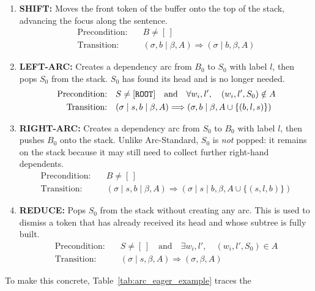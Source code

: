 \documentclass[12pt,letterpaper]{article}
\begin{document}
\begin{enumerate}
    \item \textbf{SHIFT:} Moves the front token of the buffer onto the top of the stack, advancing the focus along the sentence.
    \begin{align}
        \text{Precondition:} \quad & B \neq [\,] \\
        \text{Transition:} \quad & (\sigma, b \mid \beta, A) \Longrightarrow (\sigma \mid b, \beta, A)
    \end{align}
    
    \item \textbf{LEFT-ARC:} Creates a dependency arc from $B_0$ to $S_0$ with label $l$, then pops $S_0$ from the stack. $S_0$ has found its head and is no longer needed.
    \begin{align}
        \text{Precondition:} \quad & S \neq [\text{\texttt{ROOT}}] \quad \text{and} \quad \forall w_i, l', \quad (w_i, l', S_0) \notin A \\
        \text{Transition:} \quad & (\sigma \mid s, b \mid \beta, A) \Longrightarrow (\sigma, b \mid \beta, A \cup \{(b, l, s)\})
    \end{align}
    
    \item \textbf{RIGHT-ARC:} Creates a dependency arc from $S_0$ to $B_0$ with label $l$, then pushes $B_0$ onto the stack. Unlike Arc-Standard, $S_0$ is \emph{not} popped: it remains on the stack because it may still need to collect further right-hand dependents.
    \begin{align}
        \text{Precondition:} \quad & B \neq [\,] \\
        \text{Transition:} \quad & (\sigma \mid s, b \mid \beta, A) \Longrightarrow (\sigma \mid s \mid b, \beta, A \cup \{(s, l, b)\})
    \end{align}
    
    \item \textbf{REDUCE:} Pops $S_0$ from the stack without creating any arc. This is used to dismiss a token that has already received its head and whose subtree is fully built.
    \begin{align}
        \text{Precondition:} \quad & S \neq [\,] \quad \text{and} \quad \exists w_i, l', \quad (w_i, l', S_0) \in A \\
        \text{Transition:} \quad & (\sigma \mid s, \beta, A) \Longrightarrow (\sigma, \beta, A)
    \end{align}
\end{enumerate}
To make this concrete, Table~\ref{tab:arc_eager_example} traces the 
\end{document}
